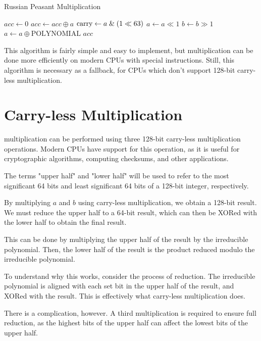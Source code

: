 \begin{algorithm}
\caption{Russian Peasant Multiplication}
\begin{algorithmic}
\State $acc \gets 0$
        \State $acc \gets acc \oplus a$
    \EndIf
    \State $\text{carry} \gets a \;\&\; (1 \ll 63)$
    \State $a \gets a \ll 1$
    \State $b \gets b \gg 1$
        \State $a \gets a \oplus \text{POLYNOMIAL}$
    \EndIf
\EndFor
\State \Return $acc$
\EndFunction
\end{algorithmic}
\end{algorithm}


This algorithm is fairly simple and easy to implement, but multiplication can be done more efficiently on modern CPUs with special instructions.
Still, this algorithm is necessary as a fallback, for CPUs which don't support 128-bit carry-less multiplication.

\section{Carry-less Multiplication}

 multiplication can be performed using three 128-bit carry-less multiplication operations.
Modern CPUs have support for this operation, as it is useful for cryptographic algorithms, computing checksums, and other applications. \cite{intel-clmul}

The terms "upper half" and "lower half" will be used to refer to the most significant 64 bits and least significant 64 bits of a 128-bit integer, respectively.

By multiplying $a$ and $b$ using carry-less multiplication, we obtain a 128-bit result.
We must reduce the upper half to a 64-bit result, which can then be XORed with the lower half to obtain the final result.

This can be done by multiplying the upper half of the result by the irreducible polynomial.
Then, the lower half of the result is the product reduced modulo the irreducible polynomial.

To understand why this works, consider the process of reduction.
The irreducible polynomial is aligned with each set bit in the upper half of the result, and XORed with the result.
This is effectively what carry-less multiplication does.

There is a complication, however.
A third multiplication is required to ensure full reduction, as the highest bits of the upper half can affect the lowest bits of the upper half.

